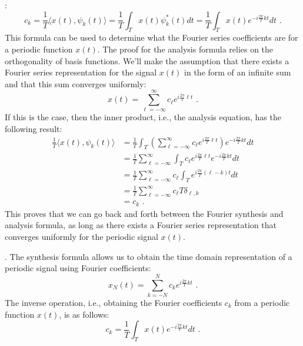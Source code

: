 :
\begin{equation}
  \boxed{
    c_k = \frac{1}{T}\langle x(t), \psi_k(t) \rangle = \frac{1}{T}\int_T x(t) \psi_k^*(t) dt = \frac{1}{T}\int_T x(t) e^{-i \frac{2\pi}{T} k t} dt
  } \,\,.
\end{equation}
This formula can be used to determine what the Fourier series coefficients are for a
periodic function $x(t)$. The proof for the analysis formula relies on the orthogonality
of basis functions. We'll make the assumption that there exists a Fourier series representation
for the signal $x(t)$ in the form of an infinite sum and that this sum
converges uniformly:
\begin{equation}
  x(t) = \sum_{\ell=-\infty}^{\infty} c_{\ell} e^{i\frac{2\pi}{T}\ell t} \,\,.
\end{equation}
If this is the case, then the inner product, i.e., the analysis
equation, has the following result:
\begin{align}
  \frac{1}{T}\langle x(t), \psi_k(t) \rangle & = \frac{1}{T}\int_T \left(\sum_{\ell=-\infty}^{\infty} c_\ell e^{i\frac{2\pi}{T}\ell t}\right) e^{-i\frac{2\pi}{T}k t}dt \\
                                             & =\frac{1}{T}\sum_{\ell=-\infty}^{\infty} \int_T c_{\ell} e^{i\frac{2\pi}{T}\ell t} e^{-i\frac{2\pi}{T}kt}dt              \\
                                             & = \frac{1}{T}\sum_{\ell=-\infty}^{\infty}c_{\ell} \int_T e^{i\frac{2\pi}{T}(\ell-k)t}dt                                  \\
                                             & = \frac{1}{T}\sum_{\ell=-\infty}^{\infty}c_{\ell} T \delta_{\ell,k}                                                      \\
                                             & = c_k \,\,.
\end{align}
This proves that we can go back and forth between the Fourier synthesis and analysis formula,
as long as there exists a Fourier series representation that 
converges uniformly for the periodic signal $x(t)$.

.
The synthesis formula allows us to obtain the time domain representation of a 
periodic signal using Fourier coefficients:
\begin{equation}
  \boxed{
    x_N(t) = \sum_{k=-N}^{N} c_k e^{i \frac{2\pi}{T}kt}
  } \,\,.
\end{equation}
The inverse operation, i.e., obtaining the Fourier coefficients $c_k$ from a
periodic function $x(t)$, is as follows:
\begin{equation}
  \boxed{
    c_k = \frac{1}{T} \int_T x(t) e^{-i \frac{2\pi}{T}kt} dt
  } \,\,.
\end{equation}

